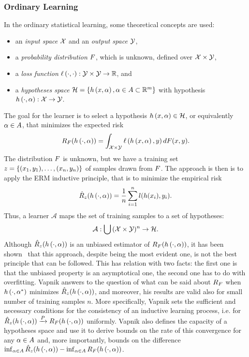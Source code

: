 \subsubsection*{Ordinary Learning}
In the ordinary statistical learning, some theoretical concepts are used:
\begin{itemize}
    \item an \emph{input space} $\mathcal{X}$ and an \emph{output space} $\mathcal{Y}$,
    \item a \emph{probability distribution} $F$, which is unknown, defined over $\mathcal{X} \times \mathcal{Y}$,
    \item a \emph{loss function} $\ell\left( \cdot, \cdot\right):\mathcal{Y} \times \mathcal{Y} \to \mathbb{R}$, and
    \item a \emph{hypotheses space} $\mathcal{H} = \left\{h\left(x, \alpha\right), \alpha \in A \subset \mathbb{R}^m\right\}$ with hypothesis $h\left(\cdot, \alpha\right): \mathcal{X} \to \mathcal{Y}$.
\end{itemize}
The goal for the learner is to select a hypothesis $h\left(x, \alpha\right) \in \mathcal{H}$, or equivalently $\alpha \in A$, that minimizes the expected risk
$$ R_F(h\left(\cdot, \alpha\right)) =  \int_{\mathcal{X} \times \mathcal{Y}} \ell\left( h\left(x, \alpha\right), y\right) dF(x, y) .$$
The distribution $F$ is unknown, but we have a training set $z = \{(x_1, y_1), \ldots, (x_n, y_n)\}$ of samples drawn from $F$. 
The approach is then is to apply the ERM inductive principle, that is to minimize the empirical risk
$$ \hat{R}_z(h\left(\cdot, \alpha\right)) = \frac{1}{n} \sum_{i=1}^n l(h(x_i), y_i).$$
Thus, a learner $\mathcal{A}$ maps the set of training samples to a set of hypotheses:
\begin{equation}
    \nonumber
    \mathcal{A} : \bigcup {(\mathcal{X}\times \mathcal{Y})^n} \to \mathcal{H}.
\end{equation}
Although $\hat{R}_z(h\left(\cdot, \alpha\right))$ is an unbiased estimator of $R_F(h\left(\cdot, \alpha\right))$, it has been shown~\cite{Vapnik00} that this approach, despite being the most evident one, is not the best principle that can be followed.
This has relation with two facts: the first one is that the unbiased property is an asymptotical one, the second one has to do with overfitting.
Vapnik answers to the question of what can be said about $R_F$ when $h\left(\cdot, \alpha^*\right)$ minimizes $\hat{R}_z(h\left(\cdot, \alpha\right))$, and moreover, his results are valid also for small number of training samples $n$.
More specifically, Vapnik sets the sufficient and necessary conditions for the consistency of an inductive learning process, i.e. for $\hat{R}_z(h\left(\cdot, \alpha\right)) \xrightarrow{P} R_F(h\left(\cdot, \alpha\right)) $ uniformly. Vapnik also defines the capacity of a hypotheses space and use it to derive bounds on the rate of this convergence for any $\alpha \in A$ and, more importantly, bounds on the difference $\inf_{\alpha \in A} \hat{R}_z(h\left(\cdot, \alpha\right)) - \inf_{\alpha \in A} R_F(h\left(\cdot, \alpha\right))$.
